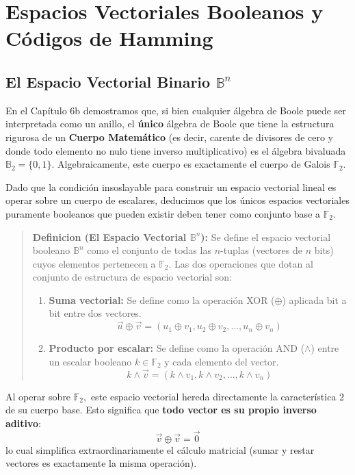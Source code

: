 \chapter{Espacios Vectoriales Booleanos y Códigos de Hamming}

\section{El Espacio Vectorial Binario $\mathbb{B}^n$}

En el Capítulo 6b demostramos que, si bien cualquier álgebra de Boole puede ser interpretada como un anillo, el \textbf{único} álgebra de Boole que tiene la estructura rigurosa de un \textbf{Cuerpo Matemático} (es decir, carente de divisores de cero y donde todo elemento no nulo tiene inverso multiplicativo) es el álgebra bivaluada $\mathbb{B}_2 = \{0, 1\}.$ Algebraicamente, este cuerpo es exactamente el cuerpo de Galois $\mathbb{F}_2.$

Dado que la condición insoslayable para construir un espacio vectorial lineal es operar sobre un cuerpo de escalares, deducimos que los únicos espacios vectoriales puramente booleanos que pueden existir deben tener como conjunto base a $\mathbb{F}_2.$

\begin{quote}\textbf{Definicion (El Espacio Vectorial $\mathbb{B}^n$):}\label{espacio_bn}
Se define el espacio vectorial booleano $\mathbb{B}^n$ como el conjunto de todas las $n$-tuplas (vectores de $n$ bits) cuyos elementos pertenecen a $\mathbb{F}_2.$ 
Las dos operaciones que dotan al conjunto de estructura de espacio vectorial son:
\begin{enumerate}
    \item \textbf{Suma vectorial:} Se define como la operación XOR ($\oplus$) aplicada bit a bit entre dos vectores.
    \[ \vec{u} \oplus \vec{v} = (u_1 \oplus v_1, u_2 \oplus v_2, \ldots, u_n \oplus v_n) \]
    \item \textbf{Producto por escalar:} Se define como la operación AND ($\wedge$) entre un escalar booleano $k \in \mathbb{F}_2$ y cada elemento del vector.
    \[ k \wedge \vec{v} = (k \wedge v_1, k \wedge v_2, \ldots, k \wedge v_n) \]
\end{enumerate}
\end{quote}

Al operar sobre $\mathbb{F}_2,$ este espacio vectorial hereda directamente la característica 2 de su cuerpo base. Esto significa que \textbf{todo vector es su propio inverso aditivo}:
\[ \vec{v} \oplus \vec{v} = \vec{0} \]
lo cual simplifica extraordinariamente el cálculo matricial (sumar y restar vectores es exactamente la misma operación).

